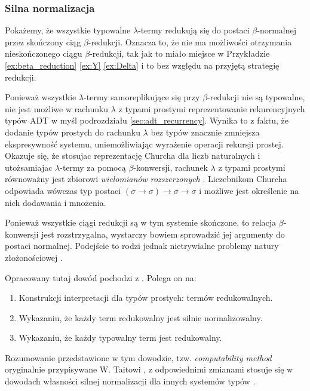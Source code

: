 \subsubsection{Silna normalizacja}\label{subsec:strong_normalization}
Pokażemy, że wszystkie typowalne \(\lambda\)-termy redukują się do postaci \(\beta\)-normalnej przez skończony ciąg \(\beta\)-redukcji. Oznacza to, że nie ma możliwości otrzymania nieskończonego ciągu \(\beta\)-redukcji, tak jak to miało miejsce w Przykładzie \ref{ex:beta_reduction} \ref{ex:Y} \ref{ex:Delta} i to bez względu na przyjętą strategię redukcji. 

Ponieważ wszystkie \(\lambda\)-termy samoreplikujące się przy \(\beta\)-redukcji nie są typowalne, nie jest możliwe  w rachunku \(\lambda\) z typami prostymi reprezentowanie rekurencyjnych typów ADT w myśl podrozdziału \ref{sec:adt_recurrency}. Wynika to z faktu, że dodanie typów prostych do rachunku \(\lambda\) bez typów znacznie zmniejsza ekspresywność systemu, uniemożliwiając wyrażenie operacji rekursji prostej. Okazuje się, że stosujac reprezentację Churcha dla liczb naturalnych i utożsamiajac \(\lambda\)-termy za pomocą \(\beta\)-konwersji, rachunek \(\lambda\) z typami prostymi równoważny jest zbiorowi \emph{wielomianów rozszerzonych} \cite{DBLP:journals/corr/abs-cs-0701022}. Liczebnikom Churcha odpowiada wówczas typ postaci \((\sigma\to\sigma)\to\sigma\to\sigma\) i możliwe jest określenie na nich dodawania i mnożenia.

Ponieważ wszystkie ciągi redukcji są w tym systemie skończone, to relacja \(\beta\)-konwersji jest rozstrzygalna, wystarczy bowiem sprowadzić jej argumenty do postaci normalnej. Podejście to rodzi jednak nietrywialne problemy natury złożonościowej \cite[Podrozdział 3.7]{Urzyczyn2006}.
 
Opracowany tutaj dowód pochodzi z \cite[Dodatek A3]{Hindley:2008:LCI:1388400}. Polega on na:
\begin{enumerate}
  \setlength\itemsep{0em}
  \item Konstrukcji interpretacji dla typów prostych: termów redukowalnych.
  \item Wykazaniu, że każdy term redukowalny jest silnie normalizowalny.
  \item Wykazaniu, że każdy typowalny term jest redukowalny.
\end{enumerate}
Rozumowanie przedstawione w tym dowodzie, tzw. \emph{computability method} oryginalnie przypisywane W. Taitowi \cite{Tait67}, z odpowiednimi zmianami stosuje się w dowodach własności silnej normalizacji dla innych systemów typów \cite[Podrozdział 11.5]{Urzyczyn2006}.

